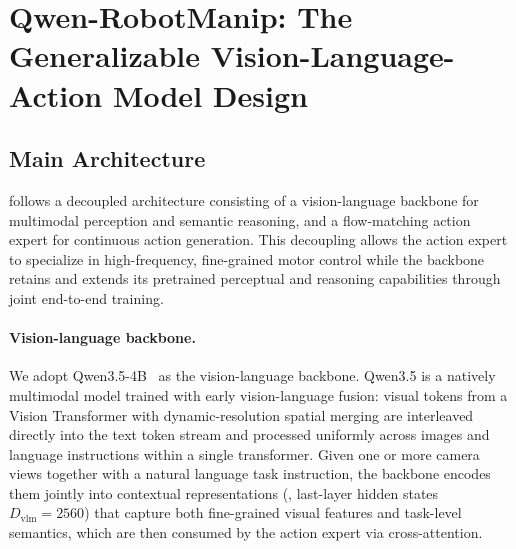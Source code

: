 \section{Qwen-RobotManip: The Generalizable Vision-Language-Action Model Design}
\label{sec:model}

\subsection{Main Architecture}

\ours follows a decoupled architecture consisting of a vision-language backbone for multimodal perception and semantic reasoning, and a flow-matching action expert for continuous action generation. This decoupling allows the action expert to specialize in high-frequency, fine-grained motor control while the backbone retains and extends its pretrained perceptual and reasoning capabilities through joint end-to-end training.

\paragraph{Vision-language backbone.}
We adopt Qwen3.5-4B~\citep{qwen35blog} as the vision-language backbone.
Qwen3.5 is a natively multimodal model trained with early vision-language fusion: visual tokens from a Vision Transformer with dynamic-resolution spatial merging are interleaved directly into the text token stream and processed uniformly across images and language instructions within a single transformer.
Given one or more camera views together with a natural language task instruction, the backbone encodes them jointly into contextual representations (\eg, last-layer hidden states $D_{\mathrm{vlm}}{=}2560$) that capture both fine-grained visual features and task-level semantics, which are then consumed by the action expert via cross-attention.

